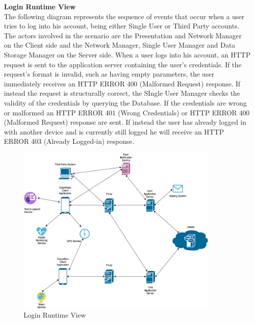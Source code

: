 \documentclass[titlepage]{article}
\begin{document}
{\bf Login Runtime View }\\ 
The following diagram represents the sequence of events that occur when a user tries to log into his account, being either Single User or Third Party accounts. The actors involved in the scenario are the Presentation and Network Manager on the Client side and the Network Manager, Single User Manager and Data Storage Manager on the Server side. 
When a user logs into his account, an HTTP request is sent to the application server containing the user’s credentials. If the request’s format is invalid, such as having empty parameters, the user immediately receives an HTTP ERROR 400 (Malformed Request) response. If instead the request is structurally correct, the SIngle User Manager checks the validity of the credentials by querying the Database. If the credentials are wrong or malformed an HTTP ERROR 401 (Wrong Credentials) or HTTP ERROR 400 (Malformed Request) response are sent. If instead the user has already logged in with another device and is currently still logged he will receive an HTTP ERROR 403 (Already Logged-in) response.

\begin{figure}[H]
	\center
  	\includegraphics[width=10cm]{Overview.png} %
  	\caption{Login Runtime View}
 	\label{fig:LOG}
\end{figure}
\end{document}

